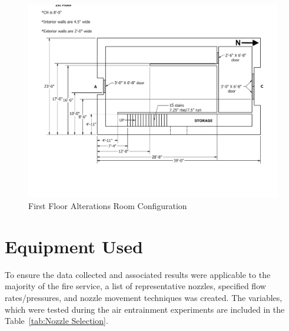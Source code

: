 \documentclass[12pt,oneside]{book}
\begin{document}
\begin{figure}[!ht]
	\centering
	\includegraphics[width=\columnwidth]{Figures/Air_Entrainment/West_Test_Structure_1st_Floor_nodim.pdf}
	\caption{First Floor Alterations Room Configuration}
	\label{fig:First_Floor_Alterations_Room_Configuration}
\end{figure}

\section{Equipment Used}

To ensure the data collected and associated results were applicable to the majority of the fire service, a list of representative nozzles, specified flow rates/pressures, and nozzle movement techniques was created. The variables, which were tested during the air entrainment experiments are included in the Table~\ref{tab:Nozzle Selection}.
\end{document}
